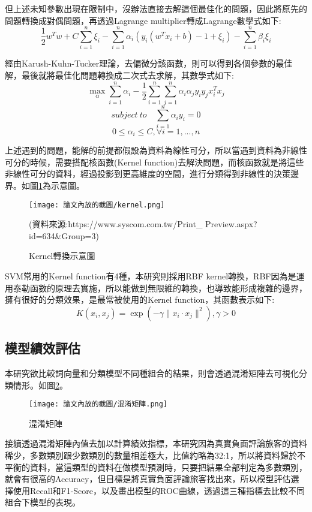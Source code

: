 \noindent 但上述未知參數出現在限制中，沒辦法直接去解這個最佳化的問題，因此將原先的問題轉換成對偶問題，再透過Lagrange multiplier轉成Lagrange數學式如下:
	$$\dfrac{1}{2}w^Tw+C\sum_{i=1}^{n}\xi_i-\sum_{i=1}^{n}\alpha_i \left(y_i(w^Tx_i+b)-1+\xi_i\right)-\sum_{i=1}^{n}\beta_i\xi_i$$

\noindent 經由Karush-Kuhn-Tucker理論，去偏微分該函數，則可以得到各個參數的最佳解，最後就將最佳化問題轉換成二次式去求解，其數學式如下:
	$$\max_{\alpha}\sum_{i=1}^{n}\alpha_i-\dfrac{1}{2}\sum_{i=1}^{n}\sum_{j=1}^{n} \alpha_i \alpha_j y_i y_j x_i^T x_j$$
	$$ subject\ to\quad \sum_{i=1}^{n}\alpha_i y_i=0$$
	$$0\leq \alpha_i \leq C , \forall i = 1,...,n$$

\newpage
 
	上述遇到的問題，能解的前提都假設為資料為線性可分，所以當遇到資料為非線性可分的時候，需要搭配核函數(Kernel function)去解決問題，而核函數就是將這些非線性可分的資料，經過投影到更高維度的空間，進行分類得到非線性的決策邊界。如圖\ref{Fi3g13}為示意圖。
	
	\begin{figure}[H]
	\centering
	\texttt{[image: 論文內放的截圖/kernel.png]}
	\caption{Kernel轉換示意圖}
	(資料來源:https://www.syscom.com.tw/Print\_ Preview.aspx?id=634\&Group=3)
	\label{Fi3g13}
	\end{figure}
	
	SVM常用的Kernel function有4種，本研究則採用RBF kernel轉換，RBF因為是運用泰勒函數的原理去實施，所以能做到無限維的轉換，也導致能形成複雜的邊界，擁有很好的分類效果，是最常被使用的Kernel function，其函數表示如下:
	$$K(x_i,x_j)=\exp\left(-\gamma \parallel x_i \cdot x_j \parallel^2\right) , \gamma>0$$
	
\newpage
	
\subsection{模型績效評估}

	本研究欲比較詞向量和分類模型不同種組合的結果，則會透過混淆矩陣去可視化分類情形。如圖\ref{Fi3g14}。
	
	\begin{figure}[H]
	\centering
	\texttt{[image: 論文內放的截圖/混淆矩陣.png]}
	\caption{混淆矩陣}
	\label{Fi3g14}
	\end{figure}
	
\noindent 接續透過混淆矩陣內值去加以計算績效指標，本研究因為真實負面評論旅客的資料稀少，多數類別跟少數類別的數量相差極大，比值約略為32:1，所以將資料歸於不平衡的資料，當這類型的資料在做模型預測時，只要把結果全部判定為多數類別，就會有很高的Accuracy，但目標是將真實負面評論旅客找出來，所以模型評估選擇使用Recall和F1-Score，以及畫出模型的ROC曲線，透過這三種指標去比較不同組合下模型的表現。


